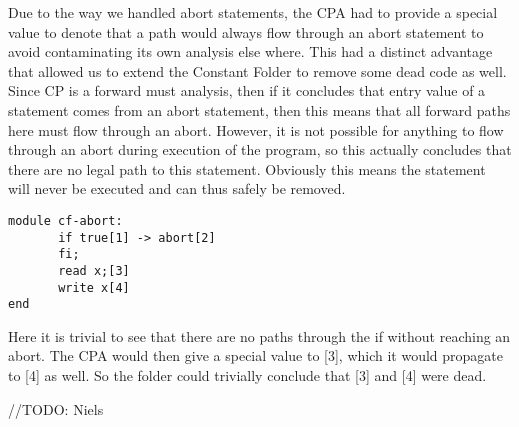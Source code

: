 \docpar
Due to the way we handled abort statements, the CPA had to provide a special
value to denote that a path would always flow through an abort statement to
avoid contaminating its own analysis else where. This had a distinct
advantage that allowed us to extend the Constant Folder to remove some dead
code as well.
  Since CP is a forward must analysis, then if it concludes that entry value of
a statement comes from an abort statement, then this means that all forward paths
here must flow through an abort. However, it is not possible for anything to flow
through an abort during execution of the program, so this actually concludes that
there are no legal path to this statement. Obviously this means the statement
will never be executed and can thus safely be removed.

\begin{lstlisting}
module cf-abort:
       if true[1] -> abort[2]
       fi;
       read x;[3]
       write x[4]
end
\end{lstlisting}

\docpar
Here it is trivial to see that there are no paths through the if without
reaching an abort. The CPA would then give a special value to [3], which
it would propagate to [4] as well. So the folder could trivially conclude
that [3] and [4] were dead.


//TODO: Niels

